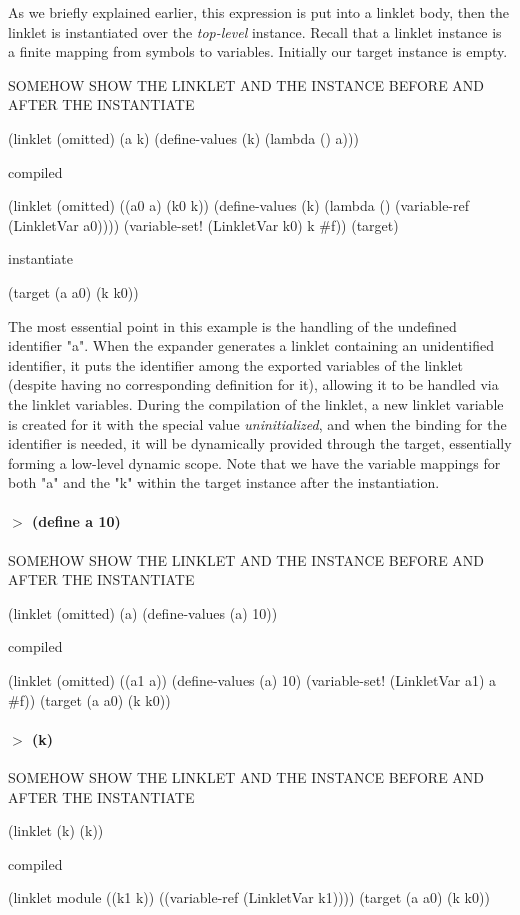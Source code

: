 As we briefly explained earlier, this expression is put into a linklet
body, then the linklet is instantiated over the \emph{top-level}
instance. Recall that a linklet instance is a finite mapping from
symbols to variables. Initially our target instance is empty.

SOMEHOW SHOW THE LINKLET AND THE INSTANCE BEFORE AND AFTER THE INSTANTIATE

(linklet (omitted) (a k) (define-values (k) (lambda () a)))

compiled

(linklet (omitted) ((a0 a) (k0 k)) (define-values (k) (lambda () (variable-ref (LinkletVar a0)))) (variable-set! (LinkletVar k0) k \#f))
(target)

instantiate

(target (a a0) (k k0))

The most essential point in this example is the handling of the
undefined identifier "a". When the expander generates a linklet
containing an unidentified identifier, it puts the identifier among
the exported variables of the linklet (despite having no corresponding
definition for it), allowing it to be handled via the linklet
variables. During the compilation of the linklet, a new linklet
variable is created for it with the special value
\emph{uninitialized}, and when the binding for the identifier is
needed, it will be dynamically provided through the target,
essentially forming a low-level dynamic scope. Note that we have the
variable mappings for both "a" and the "k" within the target instance
after the instantiation.

\paragraph{$>$ (define a 10)}

SOMEHOW SHOW THE LINKLET AND THE INSTANCE BEFORE AND AFTER THE INSTANTIATE

(linklet (omitted) (a) (define-values (a) 10))

compiled

(linklet (omitted) ((a1 a)) (define-values (a) 10) (variable-set! (LinkletVar a1) a #f))
(target (a a0) (k k0))

\paragraph{$>$ (k)}

SOMEHOW SHOW THE LINKLET AND THE INSTANCE BEFORE AND AFTER THE INSTANTIATE

(linklet (k) (k))

compiled

(linklet module ((k1 k)) ((variable-ref (LinkletVar k1))))
(target (a a0) (k k0))
